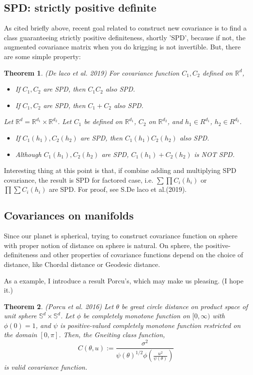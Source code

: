 \documentclass{article}
\newtheorem*{theorem}{Theorem}
\begin{document}
{\subsection{SPD: strictly positive definite}

As cited briefly above, recent goal related to construct new covariance is to find a class guaranteeing strictly positive definiteness, shortly 'SPD',
because if not, the augmented covariance matrix when you do krigging is not invertible.
But, there are some simple property:
\begin{theorem}{(De laco et al. 2019)}
    For covariance function $C_1,C_2$ defined on $\mathbb R^d$,
    \begin{itemize}
        \item If $C_1, C_2$ are SPD, then $C_1C_2$ also SPD.
        \item If $C_1, C_2$ are SPD, then $C_1+C_2$ also SPD.
    \end{itemize}
    Let $\mathbb R^d = \mathbb R^{d_1} \times \mathbb R^{d_2}$.
    Let $C_1$ be defined on $\mathbb R^{d_1}$, $C_2$ on $\mathbb R^{d_2}$, and $h_1\in R^{d_1}$, $h_2\in R^{d_2}$.
    \begin{itemize}
        \item If $C_1(h_1), C_2(h_2)$ are SPD, then $C_1(h_1)C_2(h_2)$ also SPD.
        \item Although $C_1(h_1), C_2(h_2)$ are SPD, $C_1(h_1)+C_2(h_2)$ is NOT SPD.
    \end{itemize}
\end{theorem}
Interesting thing at this point is that, if combine adding and multiplying SPD covariance, the result is SPD for factored case, i.e.
$\sum\prod C_i(h_i)$ or $\prod\sum C_i(h_i)$ are SPD. For proof, see S.De laco et al.(2019).

\subsection{Covariances on manifolds}

Since our planet is spherical, trying to construct covariance function on sphere with proper notion of distance on sphere is natural.
On sphere, the positive-definiteness and other properties of covariance functions depend on the choice of distance, like Chordal distance or Geodesic distance.

As a example, I introduce a result Porcu's, which may make us pleasing. (I hope it.)
\begin{theorem}{(Porcu et al. 2016)}
    Let $\theta$ be great circle distance on product space of unit sphere $\mathbb S^d \times \mathbb S^d$.
    Let $\phi$ be completely monotone function on $[0,\infty)$ with $\phi(0)=1$, and $\psi$ is positive-valued completely monotone function restricted on the domain $[0,\pi]$.
    Then, the Gneiting class function,
    \[C(\theta,u):=\frac{\sigma^2}{\psi(\theta)^{1/2} \phi(\frac{u^2}{\psi(\theta)})}\]
    is valid covariance function.
\end{theorem}

}
\end{document}

